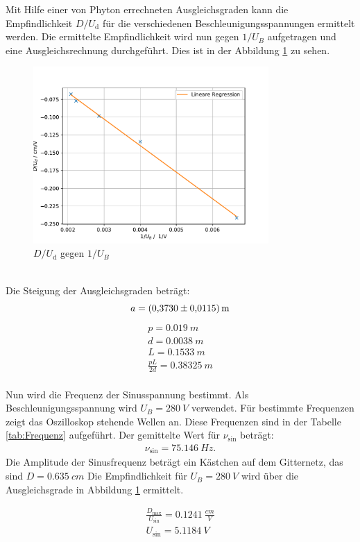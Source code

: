 Mit Hilfe einer von Phyton errechneten Ausgleichsgraden kann die Empfindlichkeit $D/U_\text{d}$ für die verschiedenen Beschleunigungsspannungen ermittelt werden.
Die ermittelte Empfindlichkeit wird nun gegen $1/U_B$ aufgetragen und eine Ausgleichsrechnung durchgeführt. Dies ist in der Abbildung \ref{fig:Ergebniss} zu sehen.
\begin{figure}[h!]
  \centering
  \includegraphics[width=0.8\textwidth]{Ergebniss.pdf}
  \caption{$D/U_{\text{d}}$ gegen $1/U_B$}
  \label{fig:Ergebniss}
\end{figure}
\\Die Steigung der Ausgleichsgraden beträgt:
\begin{equation*}
  a=\SI{0,3730 \pm 0,0115}{m}
\end{equation*}
\begin{align*}
  p=\SI{0,019}{m}\\
  d=\SI{0,0038}{m}\\
  L=\SI{0,1533}{m}\\
  \frac{pL}{2d}=\SI{0,38325}{m}
\end{align*}
\\Nun wird die Frequenz der Sinusspannung bestimmt. Als Beschleunigungsspannung wird $U_B=\SI{280}{V}$ verwendet.
Für bestimmte Frequenzen zeigt das Oszilloskop stehende Wellen an. Diese Frequenzen sind in der Tabelle \ref{tab:Frequenz} aufgeführt.
Der gemittelte Wert für $\nu_{\text{sin}}$ beträgt:
\begin{align*}
  \nu_{\text{sin}}=\SI{75,146}{Hz}.
\end{align*}
Die Amplitude der Sinusfrequenz beträgt ein Kästchen auf dem Gitternetz, das sind $D = \SI{0,635}{cm}$
Die Empfindlichkeit für $U_B=\SI{280}{V}$ wird über die Ausgleichsgrade in Abbildung \ref{fig:Ergebniss} ermittelt.

\begin{align*}
  \frac{D_{\text{max}}}{U_{\text{sin}}}=\SI{0,1241}{\frac{cm}{V}}\\
  U_{\text{sin}} = \SI{5,1184}{V}
\end{align*}
\FloatBarrier
